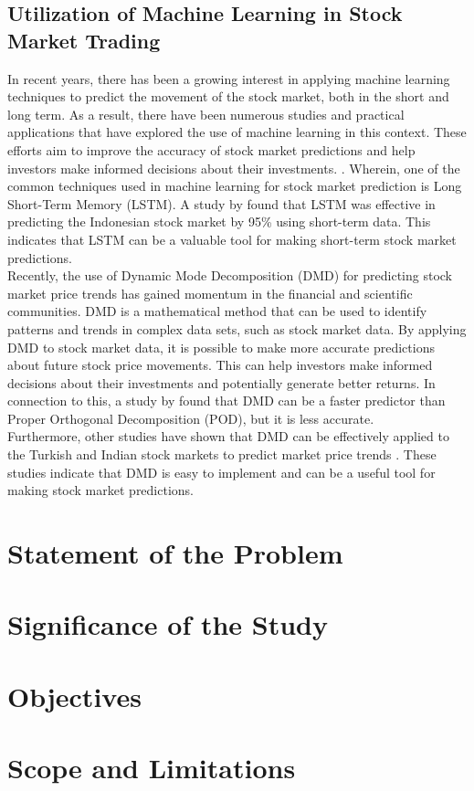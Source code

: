 \subsection{Utilization of Machine Learning in Stock Market Trading}
In recent years, there has been a growing interest in applying machine 
learning techniques to predict the movement of the stock market, both in the short 
and long term. As a result, there have been numerous studies and practical 
applications that have explored the use of machine learning in this context. 
These efforts aim to improve the accuracy of stock market predictions and help 
investors make informed decisions about their investments. 
\cite{Kumbure2022, Strader2020, Soni2022, Rea2020, Guo2022}.
 Wherein, one of the common techniques used in machine learning for 
 stock market prediction is Long Short-Term Memory (LSTM). 
 A study by  found that LSTM was effective in predicting the 
 Indonesian stock market by 95\% using short-term data. 
 This indicates that LSTM can be a valuable tool for making short-term stock 
 market predictions.
\\Recently, the use of Dynamic Mode Decomposition (DMD) 
for predicting stock market price trends has gained momentum in the financial 
and scientific communities. DMD is a mathematical method that can be used 
to identify patterns and trends in complex data sets, such as stock market data.
By applying DMD to stock market data, it is possible to make more accurate 
predictions about future stock price movements. This can help investors make
informed decisions about their investments and potentially generate better returns.
In connection to this, a study by  found that DMD can be a 
faster predictor than Proper Orthogonal Decomposition (POD), but 
it is less accurate.
\\Furthermore, other studies have shown that DMD can be effectively 
applied to the Turkish and Indian stock markets to predict market price trends
\cite{Savas2017, Kuttichira2017}.
These studies indicate that DMD is easy to implement and can be a useful 
tool for making stock market predictions.

\section{Statement of the Problem}

\section{Significance of the Study}

\section{Objectives}

\section{Scope and Limitations}
